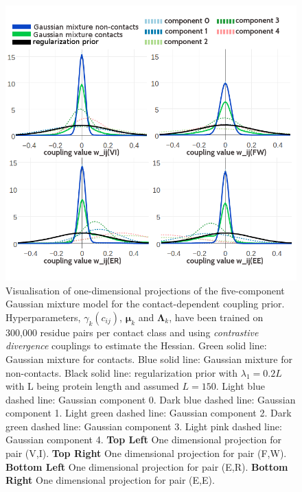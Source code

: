\documentclass[11pt,a4paper,twoside]{book}
\newcommand{\eq}{\!=\!}
\newcommand{\Lk}{\mathbf{\Lambda}_k}
\newcommand{\muk}{\mathbf{\mu}_k}
\newcommand{\cij}{c_{ij}}
\theoremstyle{definition}
\theoremstyle{definition}
\theoremstyle{remark}
\begin{document}
\begin{figure}
\includegraphics[width=1\linewidth]{img/bayesian_model/cd/5/1dvis_combined_300k} \caption{Visualisation of one-dimensional
projections of the five-component Gaussian mixture model for the
contact-dependent coupling prior. Hyperparameters, \(\gamma_k(\cij)\),
\(\muk\) and \(\Lk\), have been trained on 300,000 residue pairs per
contact class and using \emph{contrastive divergence} couplings to
estimate the Hessian. Green solid line: Gaussian mixture for contacts.
Blue solid line: Gaussian mixture for non-contacts. Black solid line:
regularization prior with \(\lambda_1 \eq 0.2L\) with L being protein
length and assumed \(L\eq150\). Light blue dashed line: Gaussian
component 0. Dark blue dashed line: Gaussian component 1. Light green
dashed line: Gaussian component 2. Dark green dashed line: Gaussian
component 3. Light pink dashed line: Gaussian component 4. \textbf{Top
Left} One dimensional projection for pair (V,I). \textbf{Top Right} One
dimensional projection for pair (F,W). \textbf{Bottom Left} One
dimensional projection for pair (E,R). \textbf{Bottom Right} One
dimensional projection for pair (E,E).}\label{fig:vis1d-cd-5comp-300k}
\end{figure}
\end{document}
